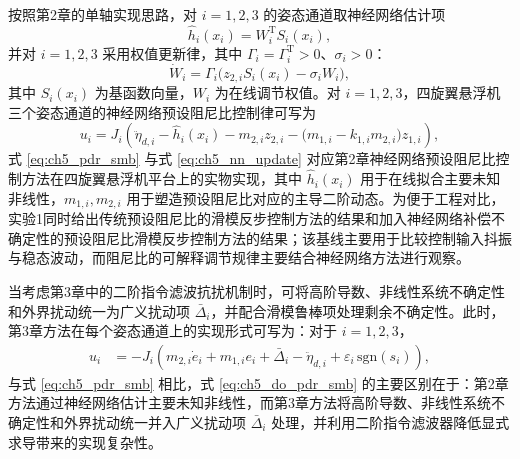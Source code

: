 按照第2章的单轴实现思路，对 $i=1,2,3$ 的姿态通道取神经网络估计项
\begin{equation}\label{eq:ch5_nn_est}
\hat h_i(x_i)=W_i^{\mathrm T}S_i(x_i),
\end{equation}
并对 $i=1,2,3$ 采用权值更新律，其中 $\Gamma_i=\Gamma_i^{\mathrm T}>0$、$\sigma_i>0$：
\begin{equation}\label{eq:ch5_nn_update}
\dot W_i=\Gamma_i\bigl(z_{2,i}S_i(x_i)-\sigma_iW_i\bigr),
\end{equation}
其中 $S_i(x_i)$ 为基函数向量，$W_i$ 为在线调节权值。对 $i=1,2,3$，四旋翼悬浮机三个姿态通道的神经网络预设阻尼比控制律可写为
\begin{equation}\label{eq:ch5_pdr_smb}
u_i=J_i\left(\ddot\eta_{d,i}-\hat h_i(x_i)-m_{2,i}z_{2,i}-\bigl(m_{1,i}-k_{1,i}m_{2,i}\bigr)z_{1,i}\right),
\end{equation}
式 \eqref{eq:ch5_pdr_smb} 与式 \eqref{eq:ch5_nn_update} 对应第2章神经网络预设阻尼比控制方法在四旋翼悬浮机平台上的实物实现，其中 $\hat h_i(x_i)$ 用于在线拟合主要未知非线性，$m_{1,i},m_{2,i}$ 用于塑造预设阻尼比对应的主导二阶动态。为便于工程对比，实验1同时给出传统预设阻尼比的滑模反步控制方法的结果和加入神经网络补偿不确定性的预设阻尼比滑模反步控制方法的结果；该基线主要用于比较控制输入抖振与稳态波动，而阻尼比的可解释调节规律主要结合神经网络方法进行观察。

当考虑第3章中的二阶指令滤波抗扰机制时，可将高阶导数、非线性系统不确定性和外界扰动统一为广义扰动项 $\bar\Delta_i$，并配合滑模鲁棒项处理剩余不确定性。此时，第3章方法在每个姿态通道上的实现形式可写为：对于 $i=1,2,3$，
\begin{subequations}\label{eq:ch5_do_pdr_smb}
\begin{align}
u_i&=-J_i\left(m_{2,i}\dot e_i+m_{1,i}e_i+\bar\Delta_i-\ddot\eta_{d,i}+\varepsilon_i\,\mathrm{sgn}(s_i)\right),
\end{align}
\end{subequations}
与式 \eqref{eq:ch5_pdr_smb} 相比，式 \eqref{eq:ch5_do_pdr_smb} 的主要区别在于：第2章方法通过神经网络估计主要未知非线性，而第3章方法将高阶导数、非线性系统不确定性和外界扰动统一并入广义扰动项 $\bar\Delta_i$ 处理，并利用二阶指令滤波器降低显式求导带来的实现复杂性。

